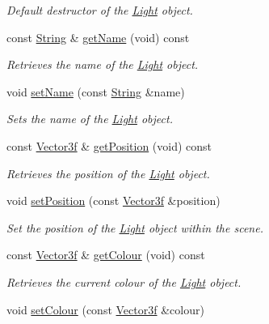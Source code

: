 \begin{DoxyCompactItemize}
\begin{DoxyCompactList}\small\item\em Default destructor of the \hyperlink{classsparky_1_1_light}{Light} object. \end{DoxyCompactList}\item 
const \hyperlink{classsparky_1_1_string}{String} \& \hyperlink{classsparky_1_1_light_a22d17e9a377e958ddf0ed5b53dee5313}{get\+Name} (void) const 
\begin{DoxyCompactList}\small\item\em Retrieves the name of the \hyperlink{classsparky_1_1_light}{Light} object. \end{DoxyCompactList}\item 
void \hyperlink{classsparky_1_1_light_aeab3760f4d8f8dc1ef77c457bbc3c665}{set\+Name} (const \hyperlink{classsparky_1_1_string}{String} \&name)
\begin{DoxyCompactList}\small\item\em Sets the name of the \hyperlink{classsparky_1_1_light}{Light} object. \end{DoxyCompactList}\item 
const \hyperlink{classsparky_1_1_vector3}{Vector3f} \& \hyperlink{classsparky_1_1_light_a4b7dae001f021aa6187964178ddfb071}{get\+Position} (void) const 
\begin{DoxyCompactList}\small\item\em Retrieves the position of the \hyperlink{classsparky_1_1_light}{Light} object. \end{DoxyCompactList}\item 
void \hyperlink{classsparky_1_1_light_adb11f7c61bd6aa9748cda3a2a76265c0}{set\+Position} (const \hyperlink{classsparky_1_1_vector3}{Vector3f} \&position)
\begin{DoxyCompactList}\small\item\em Set the position of the \hyperlink{classsparky_1_1_light}{Light} object within the scene. \end{DoxyCompactList}\item 
const \hyperlink{classsparky_1_1_vector3}{Vector3f} \& \hyperlink{classsparky_1_1_light_aa415701b5aaaa209886576df313d1b79}{get\+Colour} (void) const 
\begin{DoxyCompactList}\small\item\em Retrieves the current colour of the \hyperlink{classsparky_1_1_light}{Light} object. \end{DoxyCompactList}\item 
void \hyperlink{classsparky_1_1_light_a27f725c622d66d1d0e9800a61c7f9578}{set\+Colour} (const \hyperlink{classsparky_1_1_vector3}{Vector3f} \&colour)

\end{DoxyCompactItemize}
